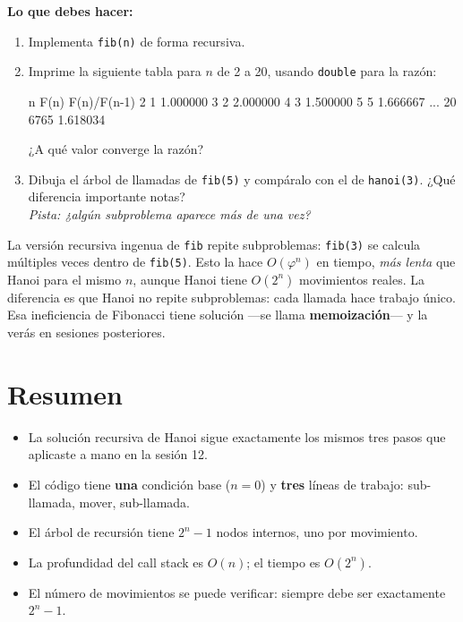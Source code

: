 \documentclass[12pt, oneside]{article}
\begin{document}
\textbf{Lo que debes hacer:}

\begin{enumerate}
  \item Implementa \texttt{fib(n)} de forma recursiva.

  \item Imprime la siguiente tabla para $n$ de 2 a 20, usando
        \texttt{double} para la razón:

\begin{codigo}
 n     F(n)     F(n)/F(n-1)
 2        1     1.000000
 3        2     2.000000
 4        3     1.500000
 5        5     1.666667
...
20     6765     1.618034
\end{codigo}

  ¿A qué valor converge la razón?

  \item Dibuja el árbol de llamadas de \texttt{fib(5)} y compáralo con
        el de \texttt{hanoi(3)}.  ¿Qué diferencia importante notas?\\
        \textit{Pista: ¿algún subproblema aparece más de una vez?}
\end{enumerate}

\begin{tecnico}
  La versión recursiva ingenua de \texttt{fib} repite subproblemas:
  \texttt{fib(3)} se calcula múltiples veces dentro de \texttt{fib(5)}.
  Esto la hace $O(\varphi^n)$ en tiempo, \textit{más lenta} que Hanoi para
  el mismo $n$, aunque Hanoi tiene $O(2^n)$ movimientos reales.
  La diferencia es que Hanoi no repite subproblemas: cada llamada hace
  trabajo único.  Esa ineficiencia de Fibonacci tiene solución —se llama
  \textbf{memoización}— y la verás en sesiones posteriores.
\end{tecnico}

\section{Resumen}

\begin{recuerda}
\begin{itemize}
  \item La solución recursiva de Hanoi sigue exactamente los mismos tres pasos
        que aplicaste a mano en la sesión 12.
  \item El código tiene \textbf{una} condición base ($n = 0$) y
        \textbf{tres} líneas de trabajo: sub-llamada, mover, sub-llamada.
  \item El árbol de recursión tiene $2^n - 1$ nodos internos, uno por movimiento.
  \item La profundidad del call stack es $O(n)$; el tiempo es $O(2^n)$.
  \item El número de movimientos se puede verificar: siempre debe ser
        exactamente $2^n - 1$.
\end{itemize}
\end{recuerda}
\end{document}
